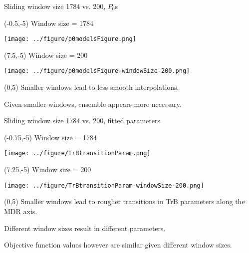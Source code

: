 \documentclass[aspectratio=169]{beamer}
\begin{document}
\begin{frame}{Sliding window size 1784 vs. 200, $P_0$s}
\begin{textblock}{7.5}(-0.5,-5)
\centering Window size = 1784

\texttt{[image: ../figure/p0modelsFigure.png]}
\end{textblock}


\begin{textblock}{7.5}(7.5,-5)
\centering Window size = 200

\texttt{[image: ../figure/p0modelsFigure-windowSize-200.png]}
\end{textblock}


\begin{textblock}{13}(0,5)
Smaller windows lead to less smooth interpolations.\medskip

Given smaller windows, ensemble appears more necessary.
\end{textblock}
\end{frame}




\begin{frame}{Sliding window size 1784 vs. 200, fitted parameters}
\begin{textblock}{7.5}(-0.75,-5)
\centering Window size = 1784\medskip

\texttt{[image: ../figure/TrBtransitionParam.png]}
\end{textblock}


\begin{textblock}{7.5}(7.25,-5)
\centering Window size = 200\medskip

\texttt{[image: ../figure/TrBtransitionParam-windowSize-200.png]}
\end{textblock}


\begin{textblock}{15}(0,5)
Smaller windows lead to rougher transitions in TrB parameters along the MDR axis.\smallskip

Different window sizes result in different parameters.\smallskip

Objective function values however are similar given different window sizes.
\end{textblock}
\end{frame}
\end{document}
